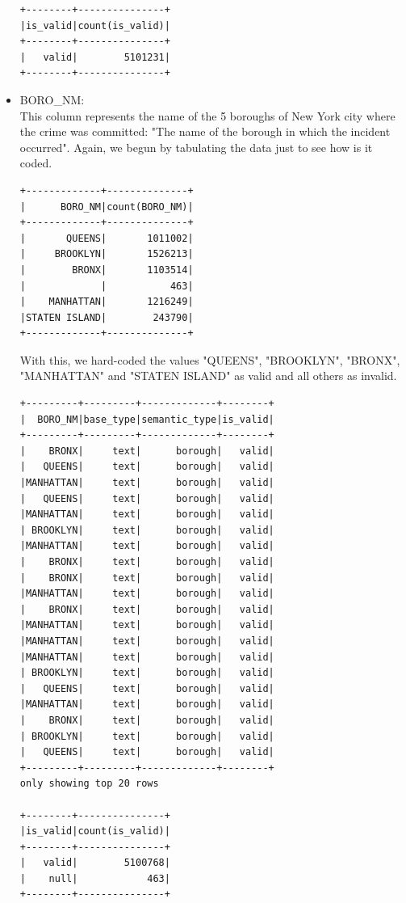 \documentclass{article}
\begin{document}
\begin{itemize}
\begin{verbatim}
+--------+---------------+
|is_valid|count(is_valid)|
+--------+---------------+
|   valid|        5101231|
+--------+---------------+
\end{verbatim}

\item BORO\_NM: \\
This column represents the name of the 5 boroughs of New York city where the crime was committed: "The name of the borough in which the incident occurred". Again, we begun by tabulating the data just to see how is it coded. 

\begin{verbatim}
+-------------+--------------+
|      BORO_NM|count(BORO_NM)|
+-------------+--------------+
|       QUEENS|       1011002|
|     BROOKLYN|       1526213|
|        BRONX|       1103514|
|             |           463|
|    MANHATTAN|       1216249|
|STATEN ISLAND|        243790|
+-------------+--------------+
\end{verbatim}

With this, we hard-coded the values "QUEENS", "BROOKLYN", "BRONX", "MANHATTAN" and "STATEN ISLAND" as valid and all others as invalid.

\begin{verbatim}
+---------+---------+-------------+--------+
|  BORO_NM|base_type|semantic_type|is_valid|
+---------+---------+-------------+--------+
|    BRONX|     text|      borough|   valid|
|   QUEENS|     text|      borough|   valid|
|MANHATTAN|     text|      borough|   valid|
|   QUEENS|     text|      borough|   valid|
|MANHATTAN|     text|      borough|   valid|
| BROOKLYN|     text|      borough|   valid|
|MANHATTAN|     text|      borough|   valid|
|    BRONX|     text|      borough|   valid|
|    BRONX|     text|      borough|   valid|
|MANHATTAN|     text|      borough|   valid|
|    BRONX|     text|      borough|   valid|
|MANHATTAN|     text|      borough|   valid|
|MANHATTAN|     text|      borough|   valid|
|MANHATTAN|     text|      borough|   valid|
| BROOKLYN|     text|      borough|   valid|
|   QUEENS|     text|      borough|   valid|
|MANHATTAN|     text|      borough|   valid|
|    BRONX|     text|      borough|   valid|
| BROOKLYN|     text|      borough|   valid|
|   QUEENS|     text|      borough|   valid|
+---------+---------+-------------+--------+
only showing top 20 rows

+--------+---------------+
|is_valid|count(is_valid)|
+--------+---------------+
|   valid|        5100768|
|    null|            463|
+--------+---------------+
\end{verbatim}


\end{itemize}
\end{document}
